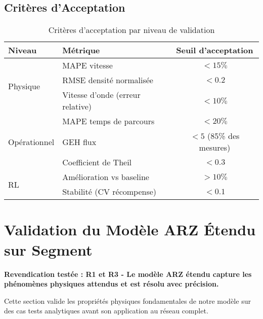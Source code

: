 \subsection{Critères d'Acceptation}
\label{subsec:criteres_acceptation}

\begin{table}[htbp]
  \centering
  \caption{Critères d'acceptation par niveau de validation}
  \label{tab:criteres_acceptation}
  \begin{tabular}{|l|l|c|}
    \hline
    \textbf{Niveau}               & \textbf{Métrique}                & \textbf{Seuil d'acceptation} \\
    \hline
    \multirow{3}{*}{Physique}     & MAPE vitesse                     & $< 15\%$                     \\
                                  & RMSE densité normalisée          & $< 0.2$                      \\
                                  & Vitesse d'onde (erreur relative) & $< 10\%$                     \\
    \hline
    \multirow{3}{*}{Opérationnel} & MAPE temps de parcours           & $< 20\%$                     \\
                                  & GEH flux                         & $< 5$ (85\% des mesures)     \\
                                  & Coefficient de Theil             & $< 0.3$                      \\
    \hline
    \multirow{2}{*}{RL}           & Amélioration vs baseline         & $> 10\%$                     \\
                                  & Stabilité (CV récompense)        & $< 0.1$                      \\
    \hline
  \end{tabular}
\end{table}


\section{Validation du Modèle ARZ Étendu sur Segment}
\label{sec:validation_arz_segment}

\textbf{Revendication testée : R1 et R3 - Le modèle ARZ étendu capture les phénomènes physiques attendus et est résolu avec précision.}

Cette section valide les propriétés physiques fondamentales de notre modèle sur des cas tests analytiques avant son application au réseau complet.

